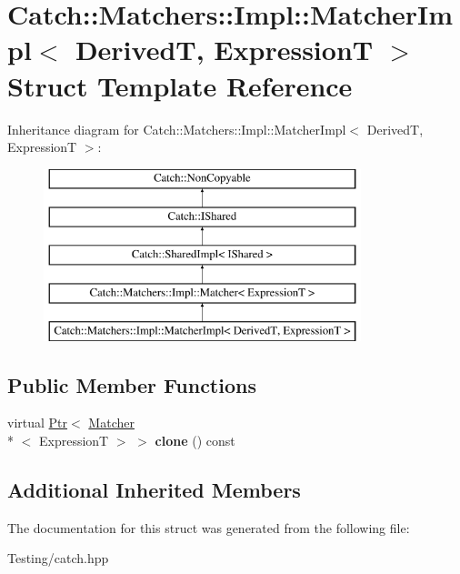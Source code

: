 \hypertarget{struct_catch_1_1_matchers_1_1_impl_1_1_matcher_impl}{\section{Catch\-:\-:Matchers\-:\-:Impl\-:\-:Matcher\-Impl$<$ Derived\-T, Expression\-T $>$ Struct Template Reference}
\label{struct_catch_1_1_matchers_1_1_impl_1_1_matcher_impl}
}
Inheritance diagram for Catch\-:\-:Matchers\-:\-:Impl\-:\-:Matcher\-Impl$<$ Derived\-T, Expression\-T $>$\-:\begin{figure}[H]
\begin{center}
\leavevmode
\includegraphics[height=5.000000cm]{struct_catch_1_1_matchers_1_1_impl_1_1_matcher_impl}
\end{center}
\end{figure}
\subsection*{Public Member Functions}
\begin{DoxyCompactItemize}
\item 
\hypertarget{struct_catch_1_1_matchers_1_1_impl_1_1_matcher_impl_afe2e10779f91394f80ff5c894fb1bfab}{virtual \hyperlink{class_catch_1_1_ptr}{Ptr}$<$ \hyperlink{struct_catch_1_1_matchers_1_1_impl_1_1_matcher}{Matcher}\\*
$<$ Expression\-T $>$ $>$ {\bfseries clone} () const }\label{struct_catch_1_1_matchers_1_1_impl_1_1_matcher_impl_afe2e10779f91394f80ff5c894fb1bfab}

\end{DoxyCompactItemize}
\subsection*{Additional Inherited Members}


The documentation for this struct was generated from the following file\-:\begin{DoxyCompactItemize}
\item 
Testing/catch.\-hpp\end{DoxyCompactItemize}
